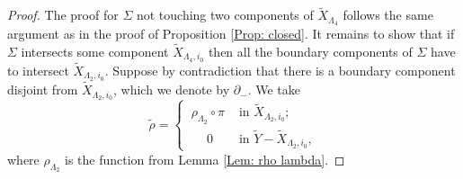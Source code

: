 \documentclass[11pt,letterpaper]{amsart}
\numberwithin{equation}{section}
\theoremstyle{definition}
\newcommand{\ti}[1]{\tilde{#1}}
\begin{document}
\begin{proof}
The proof for $\Sigma$ not touching two components of $\tilde X_{\Lambda_4}$ follows the same argument as in the proof of Proposition \ref{Prop: closed}. It remains to show that if $\Sigma$ intersects some component $\tilde X_{\Lambda_4,i_0}$ then all the boundary components of $\Sigma$ have to intersect $\tilde X_{\Lambda_2,i_0}$. Suppose by contradiction that there is a boundary component disjoint from $\tilde X_{\Lambda_2,i_0}$, which we denote by $\partial_-$. We take
\[
\tilde \rho =
\begin{cases}
\ \rho_{\Lambda_{2}}\circ\pi & \mbox{ in } \ti X_{\Lambda_2,i_{0}};\\[1mm]
\ \quad \ 0 & \mbox{ in } \ti{Y} - \ti X_{\Lambda_2,i_{0}},
\end{cases}
\]
where $\rho_{\Lambda_{2}}$ is the function from Lemma \ref{Lem: rho lambda}.



\end{proof}
\end{document}
